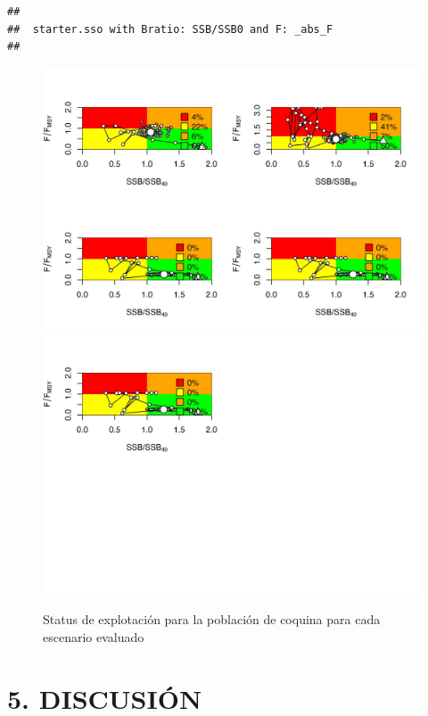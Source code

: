 \documentclass[
]{article}
\begin{document}
\begin{verbatim}
## 
##  starter.sso with Bratio: SSB/SSB0 and F: _abs_F 
## 
\end{verbatim}

\begin{figure}[H]

{\centering \includegraphics{Dtrunculus_SS3_2024_files/figure-latex/status-1} \includegraphics{Dtrunculus_SS3_2024_files/figure-latex/status-2} 

}

\caption{\label{status}Status de explotación para la población de coquina para cada escenario evaluado}\label{fig:status}
\end{figure}

\pagebreak

\hypertarget{discusiuxf3n}{%
\section{5. DISCUSIÓN}\label{discusiuxf3n}}
\end{document}
